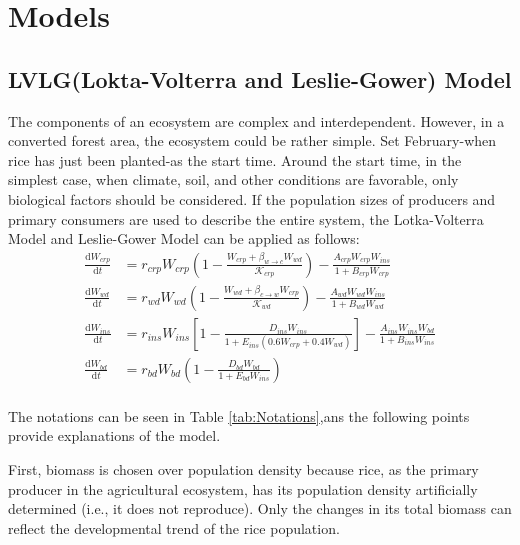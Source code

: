 \documentclass{HZNUMCM}
\begin{document}
  \section{Models}
    \subsection{LVLG(Lokta-Volterra and Leslie-Gower) Model}
      The components of an ecosystem are complex and interdependent. 
      However, in a converted forest area, the ecosystem could be rather simple.
      Set February-when rice has just been planted-as the start time.
      Around the start time, in the simplest case, when climate, soil, and other conditions are favorable, 
      only biological factors should be considered.
      If the population sizes of producers and primary consumers are used to describe the entire system, 
      the Lotka-Volterra Model\cite{wangersky1978lotka} and Leslie-Gower Model\cite{GUO20142850} can be applied as follows:
      \begin{equation}
        \begin{aligned}
          \frac{\mathrm{d}W_{crp}}{\mathrm{d}t}&=r_{crp}W_{crp}\left( 1-\frac{W_{crp}+\beta _{w\rightarrow c}W_{wd}}{\mathscr{K} _{crp}} \right) -\frac{A_{crp}W_{crp}W_{ins}}{1+B_{crp}W_{crp}}\\
          \frac{\mathrm{d}W_{wd}}{\mathrm{d}t}&=r_{wd}W_{wd}\left( 1-\frac{W_{wd}+\beta _{c\rightarrow w}W_{crp}}{\mathscr{K} _{wd}} \right) -\frac{A_{wd}W_{wd}W_{ins}}{1+B_{wd}W_{wd}}\\
          \frac{\mathrm{d}W_{ins}}{\mathrm{d}t}&=r_{ins}W_{ins}\left[ 1-\frac{D_{ins}W_{ins}}{1+E_{ins}\left( 0.6W_{crp}+0.4W_{wd} \right)} \right] -\frac{A_{ins}W_{ins}W_{bd}}{1+B_{ins}W_{ins}}\\
          \frac{\mathrm{d}W_{bd}}{\mathrm{d}t}&=r_{bd}W_{bd}\left( 1-\frac{D_{bd}W_{bd}}{1+E_{bd}W_{ins}} \right)\\
        \end{aligned} 
      \end{equation}
      
      The notations can be seen in Table \ref{tab:Notations},ans the following points provide explanations of the model.

      First, biomass is chosen over population density because rice, 
      as the primary producer in the agricultural ecosystem, 
      has its population density artificially determined (i.e., it does not reproduce). 
      Only the changes in its total biomass can reflect the developmental trend of the rice population.
      
\end{document}
